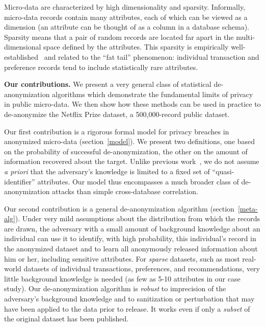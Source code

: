 \documentclass[11pt]{article}
\begin{document}

Micro-data are characterized by high dimensionality and sparsity.
Informally, micro-data records contain many attributes, each of
which can be viewed as a dimension (an attribute can be thought
of as a column in a database schema).  Sparsity means that a pair
of random records are located far apart in the multi-dimensional
space defined by the attributes.  This sparsity is empirically
well-established~\cite{bryn,longtail,LAH06} and related to the ``fat
tail'' phenomenon: individual transaction and preference records tend
to include statistically rare attributes.


\vspace{1ex}
\noindent
\textbf{Our contributions.}
We present a very general class of statistical de-anonymization algorithms
which demonstrate the fundamental limits of privacy in public micro-data.
We then show how these methods can be used in practice to de-anonymize
the Netflix Prize dataset, a 500,000-record public dataset.

Our first contribution is a rigorous formal model for privacy breaches in
anonymized micro-data (section~\ref{model}).  We present two definitions,
one based on the probability of successful de-anonymization, the other
on the amount of information recovered about the target.  Unlike previous
work~\cite{sweeney}, we do not assume \emph{a priori} that the adversary's
knowledge is limited to a fixed set of ``quasi-identifier'' attributes.
Our model thus encompasses a much broader class of de-anonymization
attacks than simple cross-database correlation.

Our second contribution is a general de-anonymization algorithm
(section~\ref{meta-alg}).  Under very mild assumptions about the
distribution from which the records are drawn, the adversary with a small
amount of background knowledge about an individual can use it to identify,
with high probability, this individual's record in the anonymized dataset
and to learn all anonymously released information about him or her,
including sensitive attributes.  For \emph{sparse} datasets, such as
most real-world datasets of individual transactions, preferences, and
recommendations, very little background knowledge is needed (as few as
5-10 attributes in our case study).  Our de-anonymization algorithm is
\emph{robust} to imprecision of the adversary's background knowledge
and to sanitization or perturbation that may have been applied to the
data prior to release.  It works even if only a \emph{subset} of the
original dataset has been published.
\end{document}
